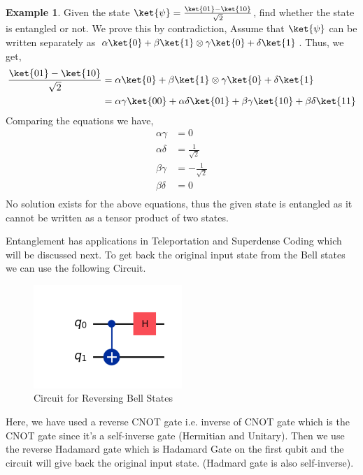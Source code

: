 \documentclass[12pt, oneside]{book}
\theoremstyle{definition}
\theoremstyle{definition}
\newtheorem{example}{Example}[section]
\theoremstyle{remark}
\begin{document}
\begin{example}
    Given the state $\ket{\psi}=\frac{\ket{01}-\ket{10}}{\sqrt{2}}$, find whether the state is entangled or not.
    We prove this by contradiction, Assume that $\ket{\psi}$ can be written separately as $\alpha\ket{0}+\beta\ket{1} \otimes \gamma\ket{0}+\delta\ket{1}$.
    Thus, we get, 
    \begin{align*}
        \frac{\ket{01}-\ket{10}}{\sqrt{2}}&=\alpha\ket{0}+\beta\ket{1} \otimes \gamma\ket{0}+\delta\ket{1}\\
        &=\alpha\gamma\ket{00}+\alpha\delta\ket{01}+\beta\gamma\ket{10}+\beta\delta\ket{11}\\
    \end{align*}
    Comparing the equations we have, 
    \begin{align*}
        \alpha\gamma&=0 \\
        \alpha\delta&=\frac{1}{\sqrt{2}} \\
        \beta\gamma&=-\frac{1}{\sqrt{2}} \\
        \beta\delta&=0 \\
    \end{align*}
    No solution exists for the above equations, thus the given state is entangled as it cannot be written as a tensor product of two states.
\end{example}
Entanglement has applications in Teleportation and Superdense Coding which will be discussed next.
To get back the original input state from the Bell states we can use the following Circuit.
\begin{figure}[H]
    \centering
    \includegraphics[width=0.5\textwidth]{../images/bell-states-rev.png}
    \caption{Circuit for Reversing Bell States}
    \label{fig:bell-states-rev}
\end{figure}
Here, we have used a reverse CNOT gate i.e. inverse of CNOT gate which is the CNOT gate since it's a self-inverse gate (Hermitian and Unitary).
Then we use the reverse Hadamard gate which is Hadamard Gate on the first qubit and the circuit will give back the original input state. (Hadmard gate is also self-inverse).
\end{document}
